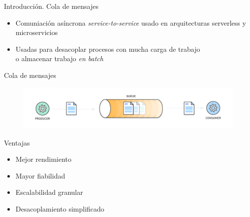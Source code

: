 \documentclass{beamer}
\begin{document}
  \begin{frame}{Introducción. Cola de mensajes}
    \begin{itemize}
      \item Comuniación asíncrona \textit{service-to-service}
      usado en arquitecturas serverless y microservicios
      \item Usadas para desacoplar procesos con mucha carga de trabajo\\
      o almacenar trabajo \textit{en batch}
    \end{itemize}
  \end{frame}

  \begin{frame}[plain]{Cola de mensajes}
    \begin{figure}
      \includegraphics[width=\textwidth]{msg_queue.png}
    \end{figure}
  \end{frame}

  \begin{frame}{Ventajas}
    \begin{itemize}
      \item Mejor rendimiento
      \item Mayor fiabilidad
      \item Escalabilidad granular
      \item Desacoplamiento simplificado
    \end{itemize}
  \end{frame}

\end{document}
